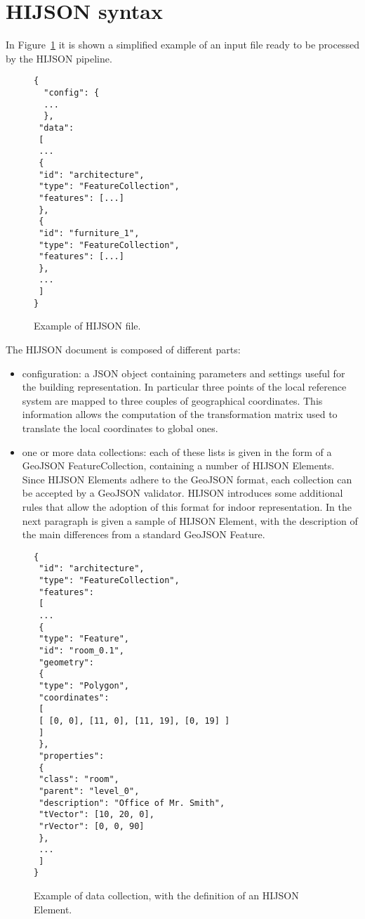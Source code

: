 
\section{HIJSON syntax}\label{hijson-syntax}

In Figure~\ref{fig:HIJSON} it is shown a simplified example of an input file ready to be processed by the HIJSON pipeline.

\begin{figure}[h]
\begin{verbatim}
{
  "config": {
  ...
  },
 "data": 
 [
 ...
 {
 "id": "architecture",
 "type": "FeatureCollection",
 "features": [...] 
 },
 {
 "id": "furniture_1",
 "type": "FeatureCollection",
 "features": [...] 
 },
 ...
 ]
}
\end{verbatim}
\caption{Example of HIJSON file.}
\label{fig:HIJSON}
\end{figure}

The HIJSON document is composed of different parts:

\begin{itemize}
\itemsep1pt\parskip0pt
\item 
 configuration: a JSON object containing parameters and settings useful
 for the building representation. In particular three points of the local
 reference system are mapped to three couples of geographical coordinates.
 This information allows the computation of the transformation matrix used to
 translate the local coordinates to global ones.
\item
 one or more data collections: each of these lists is given in the form of
 a GeoJSON FeatureCollection, containing a number of HIJSON Elements. Since
 HIJSON Elements adhere to the GeoJSON format, each collection can be
 accepted by a GeoJSON validator. HIJSON introduces some additional rules
 that allow the adoption of this format for indoor representation. In the
 next paragraph is given a sample of HIJSON Element, with the description of
 the main differences from a standard GeoJSON Feature. 
\end{itemize}


\begin{figure}[h]
\begin{verbatim}
{
 "id": "architecture",
 "type": "FeatureCollection",
 "features": 
 [
 ...
 {
 "type": "Feature",
 "id": "room_0.1",
 "geometry": 
 {
 "type": "Polygon",
 "coordinates": 
 [ 
 [ [0, 0], [11, 0], [11, 19], [0, 19] ]
 ]
 },
 "properties": 
 {
 "class": "room",
 "parent": "level_0",
 "description": "Office of Mr. Smith",
 "tVector": [10, 20, 0],
 "rVector": [0, 0, 90]
 },
 ...
 ]
}
\end{verbatim}
\caption{Example of data collection, with the definition of an HIJSON Element.}
\label{fig:dataCollection}
\end{figure}

